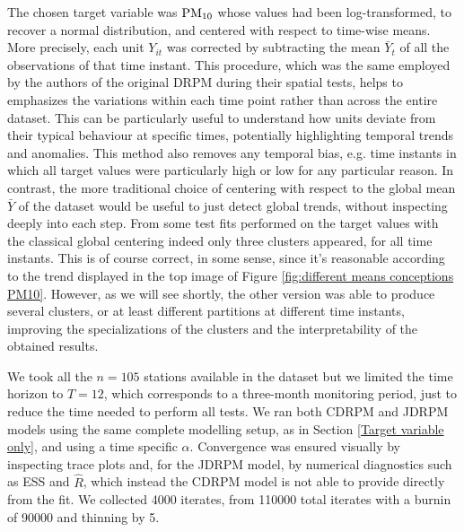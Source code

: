 \documentclass[12pt,	%
	a4paper,		%
	twoside,		%
	openright,		%
	titlepage,%
	]{book}
\theoremstyle{definition}
\begin{document}
The chosen target variable was $\text{PM}_{10}$ whose values had been log-transformed, to recover a normal distribution, and centered with respect to time-wise means. More precisely, each unit $Y_{it}$ was corrected by subtracting the mean $\bar{Y}_t$ of all the observations of that time instant. This procedure, which was the same employed by the authors of the original DRPM during their spatial tests, helps to emphasizes the variations within each time point rather than across the entire dataset. This can be particularly useful to understand how units deviate from their typical behaviour at specific times, potentially highlighting temporal trends and anomalies. This method also removes any temporal bias, e.g. time instants in which all target values were particularly high or low for any particular reason. In contrast, the more traditional choice of centering with respect to the global mean $\bar{Y}$ of the dataset would be useful to just detect global trends, without inspecting deeply into each step. From some test fits performed on the target values with the classical global centering indeed only three clusters appeared, for all time instants. This is of course correct, in some sense, since it's reasonable according to the trend displayed in the top image of Figure \ref{fig:different means conceptions PM10}. However, as we will see shortly, the other version was able to produce several clusters, or at least different partitions at different time instants, improving the specializations of the clusters and the interpretability of the obtained results.

We took all the $n=105$ stations available in the dataset but we limited the time horizon to $T=12$, which corresponds to a three-month monitoring period, just to reduce the time needed to perform all tests. We ran both CDRPM and JDRPM models using the same complete modelling setup, as in Section \ref{Target variable only}, and using a time specific $\alpha$. Convergence was ensured visually by inspecting trace plots and, for the JDRPM model, by numerical diagnostics such as ESS and $\hat R$, which instead the CDRPM model is not able to provide directly from the fit. We collected 4000 iterates, from 110000 total iterates with a burnin of 90000 and thinning by 5. 
\end{document}
